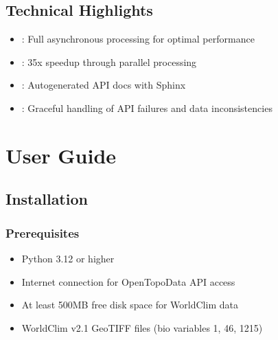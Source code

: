\documentclass[letterpaper,10pt,english]{sphinxmanual}
\begin{document}
\section{Technical Highlights}
\label{\detokenize{overview:technical-highlights}}\begin{itemize}
\item {} 
\sphinxAtStartPar
{}: Full asynchronous processing for optimal performance

\item {} 
\sphinxAtStartPar
{}: 3\sphinxhyphen{}5x speedup through parallel processing

\item {} 
\sphinxAtStartPar
{}: Auto\sphinxhyphen{}generated API docs with Sphinx

\item {} 
\sphinxAtStartPar
{}: Graceful handling of API failures and data inconsistencies

\end{itemize}

\sphinxstepscope


\chapter{User Guide}
\label{\detokenize{user_guide:user-guide}}\label{\detokenize{user_guide::doc}}

\section{Installation}
\label{\detokenize{user_guide:installation}}

\subsection{Prerequisites}
\label{\detokenize{user_guide:prerequisites}}\begin{itemize}
\item {} 
\sphinxAtStartPar
Python 3.12 or higher

\item {} 
\sphinxAtStartPar
Internet connection for Open\sphinxhyphen{}Topo\sphinxhyphen{}Data API access

\item {} 
\sphinxAtStartPar
At least 500MB free disk space for WorldClim data

\item {} 
\sphinxAtStartPar
WorldClim v2.1 GeoTIFF files (bio variables 1, 4\sphinxhyphen{}6, 12\sphinxhyphen{}15)

\end{itemize}
\end{document}

